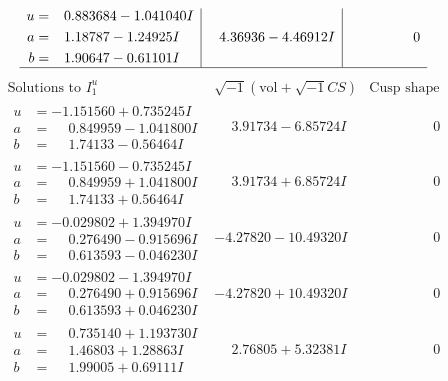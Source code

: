 \documentclass[1p]{elsarticle_modified}
\theoremstyle{definition}
\newcommand{\I}{\sqrt{-1}}
\begin{document}
$$\begin{array}{c|c|c}
\begin{aligned}
u &= \phantom{-}0.883684 - 1.041040 I \\
a &= \phantom{-}1.18787 - 1.24925 I \\
b &= \phantom{-}1.90647 - 0.61101 I\end{aligned}
 & \phantom{-}4.36936 - 4.46912 I & \phantom{-0.000000 } 0\\
 \hline 
 \end{array}$$\newpage$$\begin{array}{c|c|c}  
\text{Solutions to }I^u_{1}& \I (\text{vol} + \sqrt{-1}CS) & \text{Cusp shape}\\
 \hline 
\begin{aligned}
u &= -1.151560 + 0.735245 I \\
a &= \phantom{-}0.849959 - 1.041800 I \\
b &= \phantom{-}1.74133 - 0.56464 I\end{aligned}
 & \phantom{-}3.91734 - 6.85724 I & \phantom{-0.000000 } 0 \\ \hline\begin{aligned}
u &= -1.151560 - 0.735245 I \\
a &= \phantom{-}0.849959 + 1.041800 I \\
b &= \phantom{-}1.74133 + 0.56464 I\end{aligned}
 & \phantom{-}3.91734 + 6.85724 I & \phantom{-0.000000 } 0 \\ \hline\begin{aligned}
u &= -0.029802 + 1.394970 I \\
a &= \phantom{-}0.276490 - 0.915696 I \\
b &= \phantom{-}0.613593 - 0.046230 I\end{aligned}
 & -4.27820 - 10.49320 I & \phantom{-0.000000 } 0 \\ \hline\begin{aligned}
u &= -0.029802 - 1.394970 I \\
a &= \phantom{-}0.276490 + 0.915696 I \\
b &= \phantom{-}0.613593 + 0.046230 I\end{aligned}
 & -4.27820 + 10.49320 I & \phantom{-0.000000 } 0 \\ \hline\begin{aligned}
u &= \phantom{-}0.735140 + 1.193730 I \\
a &= \phantom{-}1.46803 + 1.28863 I \\
b &= \phantom{-}1.99005 + 0.69111 I\end{aligned}
 & \phantom{-}2.76805 + 5.32381 I & \phantom{-0.000000 } 0 \\ \hline\begin{aligned}

\end{aligned}
\end{array}$$
\end{document}
